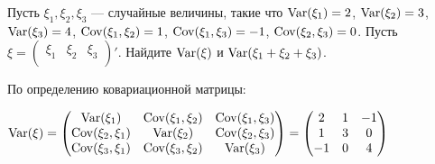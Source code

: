\begin{problem}
Пусть $\xi_1, \xi_2, \xi_3$ — случайные величины, такие что $\operatorname{Var} (\xi_1) = 2$, $\operatorname{Var} (\xi_2) = 3$, $\operatorname{Var} (\xi_3) = 4$, $\operatorname{Cov} (\xi_1, \xi_2) = 1$, $\operatorname{Cov} (\xi_1, \xi_3) = -1$, $\operatorname{Cov} (\xi_2, \xi_3) = 0$. Пусть $\xi =  \begin{pmatrix}
\xi_1 & \xi_2 & \xi_3 \\
\end{pmatrix} '$. Найдите $\operatorname{Var} (\xi)$ и $\operatorname{Var} (\xi_1 + \xi_2 + \xi_3)$.


\begin{sol}
По определению ковариационной матрицы:

$\operatorname{Var} (\xi) =  \begin{pmatrix}
\operatorname{Var} (\xi_1) & \operatorname{Cov} (\xi_1, \xi_2) & \operatorname{Cov} (\xi_1, \xi_3) \\
\operatorname{Cov} (\xi_2, \xi_1) & \operatorname{Var} (\xi_2) & \operatorname{Cov} (\xi_2, \xi_3) \\
\operatorname{Cov} (\xi_3, \xi_1) & \operatorname{Cov} (\xi_3, \xi_2) & \operatorname{Var} (\xi_3) \\
\end{pmatrix}  =  \begin{pmatrix}
2 & 1 & -1 \\
1 & 3 & 0 \\
-1 & 0 & 4 \\
\end{pmatrix} $


\end{sol}
\end{problem}
